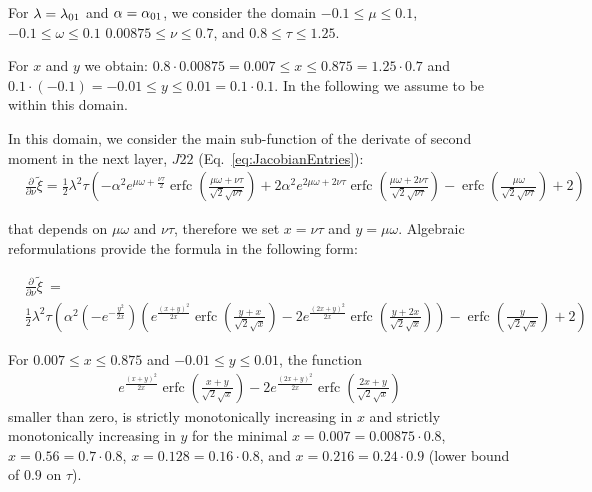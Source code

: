 \documentclass{article}
\newcommand\xinn{{\tilde \xi}}
\renewcommand{\leq}{\leqslant}
\DeclareMathOperator{\erfc}{erfc}
\begin{document}
For $\lambda=\lambda_{\rm 01}$ and 
$\alpha=\alpha_{\rm 01}$,
we consider the domain
$-0.1 \leq \mu \leq 0.1$, 
$-0.1 \leq \omega \leq 0.1$ 
$0.00875 \leq \nu \leq 0.7$, and 
$0.8 \leq \tau \leq 1.25$.

For $x$ and $y$ we obtain: $0.8 \cdot 0.00875=0.007 \leq x \leq 0.875=1.25 \cdot 0.7$ and 
$0.1 \cdot (-0.1)= -0.01 \leq y \leq 0.01=0.1 \cdot 0.1$.
In the following we assume to be within this domain.

In this domain, we consider the main sub-function of the derivate of second moment in the next layer, $J22$ (Eq.~\eqref{eq:JacobianEntries}):
\begin{align}
&\frac{\partial}{\partial \nu} \xinn= \frac{1}{2} \lambda ^2 \tau \left(- \alpha ^2 e^{\mu \omega+\frac{\nu \tau}{2}} \erfc \left(\frac{\mu \omega+\nu \tau}{\sqrt{2} \sqrt{\nu \tau}}\right) +  
    2 \alpha ^2 e^{2 \mu
    \omega+2 \nu \tau} \erfc \left(\frac{\mu \omega+2
      \nu \tau}{\sqrt{2} \sqrt{\nu
        \tau}}\right)-\erfc \left(\frac{\mu
      \omega}{\sqrt{2} \sqrt{\nu \tau}}\right)+2\right)
\end{align}

that depends on $\mu \omega$ and $\nu \tau$, therefore we 
set  $x=\nu \tau$ and $y=\mu \omega$. Algebraic reformulations provide the 
formula in the following form:

\begin{align}
& \frac{\partial}{\partial\nu}\xinn\ = \\ \nonumber
& \frac{1}{2}\lambda^{2}\tau
\left(\alpha^{2}\left(-e^{-\frac{y^{2}}{2x}}\right) \left(e^{\frac{(x+y)^{2}}{2x}}\erfc\left(\frac{y+x}{\sqrt{2}\sqrt{x}}\right)-2e^{\frac{(2x+y)^{2}}{2x}}\erfc\left(\frac{y+2x}{\sqrt{2}\sqrt{x}}\right)\right)
-\erfc\left(\frac{y}{\sqrt{2}\sqrt{x}}\right)+ 2\right)
\end{align}


\begin{lemma}
\label{lem:subfunction1}

For $0.007 \leq x \leq 0.875$ and $-0.01 \leq y \leq 0.01$, 
the function
\begin{align}
\label{eq:subfunction1}
e^{\frac{(x+y)^2}{2 x}} \erfc \left(\frac{x+y}{\sqrt{2} \sqrt{x}}\right)-2 e^{\frac{(2 x+y)^2}{2 x}} \erfc \left(\frac{2 x+y}{\sqrt{2} \sqrt{x}}\right)
\end{align}
smaller than zero, is strictly monotonically increasing in $x$
and strictly monotonically increasing in $y$ for the minimal $x=0.007=0.00875 \cdot 0.8$,
$x=0.56=0.7 \cdot 0.8$, $x=0.128=0.16 \cdot 0.8$, and $x=0.216=0.24 \cdot 0.9$ (lower
bound of $0.9$ on $\tau$).
\end{lemma}
\end{document}
